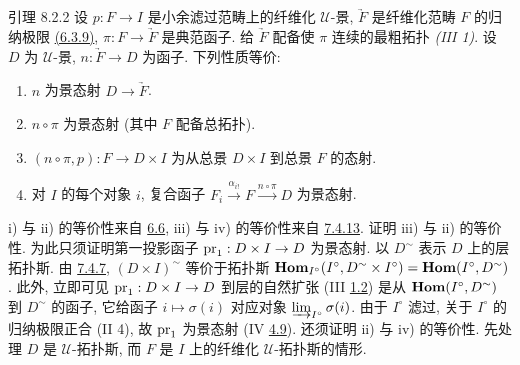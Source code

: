 \begin{enonce*}{引理 8.2.2}
设 $p:F\to I$ 是小余滤过范畴上的纤维化 $𝒰$-景,
$\underrightarrow{F}$ 是纤维化范畴 $F$ 的归纳极限
\hyperref[VI.def6.3]{(6.3.9)},
$\pi:F\to\underrightarrow{F}$ 是典范函子.
给 $\underrightarrow{F}$ 配备使 $\pi$ 连续的最粗拓扑
\emph{(III 1)}.
设 $D$ 为 $𝒰$-景,
$n:\underrightarrow{F}\to D$ 为函子.
下列性质等价:
\begin{enumerate}
\renewcommand{\theenumi}{\roman{enumi}}
\renewcommand{\labelenumi}{\theenumi)}
\item $n$ 为景态射 $D\to\underrightarrow{F}$.

\item $n\circ\pi$ 为景态射
(其中 $F$ 配备总拓扑).

\item $(n\circ\pi,p):F\to D\times I$
为从总景 $D\times I$ 到总景 $F$ 的态射.

\item 对 $I$ 的每个对象 $i$,
复合函子 $F_i\xrightarrow{\alpha_{i!}}F\xrightarrow{n\circ\pi}D$
为景态射.
\end{enumerate}
\end{enonce*}

 i) 与 ii) 的等价性来自 \hyperref[VI.exe6.6]{6.6},
 iii) 与 iv) 的等价性来自 \hyperref[VI.thm7.4.13.1]{7.4.13}.
证明 iii) 与 ii) 的等价性.
为此只须证明第一投影函子 $\pr_1:D\times I\to D$ 为景态射.
以 $D^{\sim}$ 表示 $D$ 上的层拓扑斯.
由 \hyperref[VI.prop7.4.7]{7.4.7},
$(D\times I)^{\sim}$ 等价于拓扑斯
$\operatorname{\mathbf{Hom}}_{I^{\circ}}(I^{\circ},D^{\sim}\times I^{\circ})=
\operatorname{\mathbf{Hom}}(I^{\circ},D^{\sim})$.
此外, 立即可见 $\pr_1:D\times I\to D$
到层的自然扩张 (III \hyperref[III.prop1.2]{1.2})
是从 $\operatorname{\mathbf{Hom}}(I^{\circ},D^{\sim})$ 到 $D^{\sim}$ 的函子,
它给函子 $i\mapsto\sigma(i)$
对应对象 $\varinjlim_{I^{\circ}}\sigma(i)$.
由于 $I^{\circ}$ 滤过,
关于 $I^{\circ}$ 的归纳极限正合 (II 4),
故 $\operatorname{pr}_1$ 为景态射 (IV \hyperref[IV.subsec4.9]{4.9}).
还须证明 ii) 与 iv) 的等价性.
先处理 $D$ 是 $𝒰$-拓扑斯,
而 $F$ 是 $I$ 上的纤维化 $𝒰$-拓扑斯的情形.

